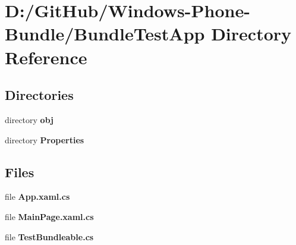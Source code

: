 \section{D\+:/\+Git\+Hub/\+Windows-\/\+Phone-\/\+Bundle/\+Bundle\+Test\+App Directory Reference}
\label{dir_4ec9398213b1b0ab2c2a39025296e5a3}
\subsection*{Directories}
\begin{DoxyCompactItemize}
\item 
directory {\bf obj}
\item 
directory {\bf Properties}
\end{DoxyCompactItemize}
\subsection*{Files}
\begin{DoxyCompactItemize}
\item 
file {\bfseries App.\+xaml.\+cs}
\item 
file {\bfseries Main\+Page.\+xaml.\+cs}
\item 
file {\bfseries Test\+Bundleable.\+cs}
\end{DoxyCompactItemize}
